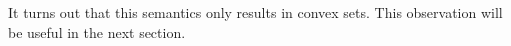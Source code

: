\documentclass{article}
\newcommand\SD{_{\text{sd}}}
\newcommand{\bmu}{\boldsymbol{\mu}}
\newcommand{\Ed}{\mathcal E}
\newcommand{\MN}{PDG}
\newcommand{\MNs}{\MN s}
\numberwithin{equation}{section}
\begin{document}
{%






	
	
	It turns out that this semantics only results in convex sets. This observation will be useful in the next section.}
\end{document}
